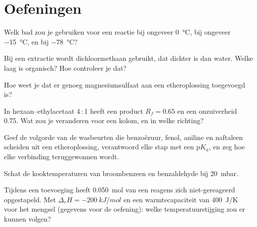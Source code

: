 \section{Oefeningen}

\begin{exercise}[$\star$]\label{exo:b2:lab-techniques-2:1}
Welk bad zou je gebruiken voor een reactie bij ongeveer \qty{0}{\degreeCelsius}, bij ongeveer
\qty{-15}{\degreeCelsius}, en bij \qty{-78}{\degreeCelsius}?
\end{exercise}

\begin{exercise}[$\star$]\label{exo:b2:lab-techniques-2:2}
Bij een extractie wordt dichloormethaan gebruikt, dat dichter is dan water. Welke laag is organisch? Hoe controleer je dat?
\end{exercise}

\begin{exercise}[$\star$]\label{exo:b2:lab-techniques-2:3}
Hoe weet je dat er genoeg magnesiumsulfaat aan een etheroplossing toegevoegd is?
\end{exercise}

\begin{exercise}[$\star$]\label{exo:b2:lab-techniques-2:4}
In hexaan--ethylacetaat 4\,:\,1 heeft een product $R_f = 0.65$ en een onzuiverheid 0.75. Wat zou je veranderen
voor een kolom, en in welke richting?
\end{exercise}

\begin{exercise}[$\star\star$]\label{exo:b2:lab-techniques-2:5}
Geef de volgorde van de wasbeurten die benzoëzuur, fenol, aniline en naftaleen scheiden uit een
etheroplossing, verantwoord elke stap met een $\mathrm pK_a$, en zeg hoe elke verbinding teruggewonnen wordt.
\end{exercise}

\begin{exercise}[$\star\star$]\label{exo:b2:lab-techniques-2:6}
Schat de kooktemperaturen van broombenzeen en benzaldehyde bij \qty{20}{mbar}.
\end{exercise}

\begin{exercise}[$\star\star$]\label{exo:b2:lab-techniques-2:7}
Tijdens een toevoeging heeft \qty{0.050}{mol} van een reagens zich niet-gereageerd opgestapeld. Met $\Delta_rH =
\qty{-200}{kJ/mol}$ en een warmtecapaciteit van \qty{400}{J/K} voor het mengsel (gegevens voor de oefening): welke
temperatuurstijging zou er kunnen volgen?
\end{exercise}

